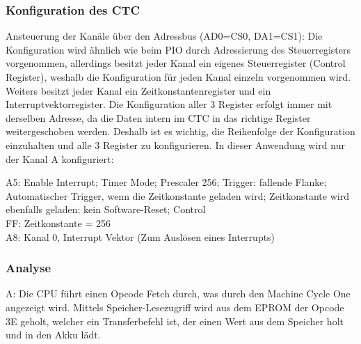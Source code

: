 \subsubsection{Konfiguration des CTC}
Ansteuerung der Kanäle über den Adressbus (AD0=CS0, DA1=CS1):
Die Konfiguration wird ähnlich wie beim PIO durch Adressierung des Steuerregisters vorgenommen, allerdings besitzt jeder Kanal ein eigenes Steuerregister (Control Register), weshalb die Konfiguration für jeden Kanal einzeln vorgenommen wird. Weiters besitzt jeder Kanal ein Zeitkonstantenregister und ein Interruptvektorregister. Die Konfiguration aller 3 Register erfolgt immer mit derselben Adresse, da die Daten intern im CTC in das richtige Register weitergeschoben werden. Deshalb ist es wichtig, die Reihenfolge der Konfiguration einzuhalten und alle 3 Register zu konfigurieren.
In dieser Anwendung wird nur der Kanal A konfiguriert:

A5:	Enable Interrupt; Timer Mode; Prescaler 256; Trigger: fallende Flanke; Automatischer Trigger, wenn die Zeitkonstante geladen wird; Zeitkonstante wird ebenfalls geladen; kein Software-Reset; Control\\
FF: Zeitkonstante = 256\\
A8: Kanal 0, Interrupt Vektor (Zum Auslösen eines Interrupts)

\subsubsection{Analyse}
A: Die CPU führt einen Opcode Fetch durch, was durch den Machine Cycle One angezeigt wird. Mittels Speicher-Lesezugriff wird aus dem EPROM der Opcode 3E geholt, welcher ein Transferbefehl ist, der einen Wert aus dem Speicher holt und in den Akku lädt.

